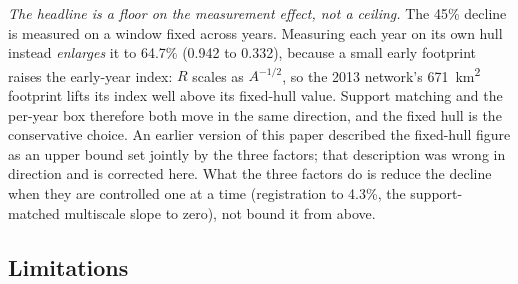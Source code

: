 \documentclass{article}
\newcommand{\rOwnHull}{64.7}
\newcommand{\rOwnHullFirst}{0.942}
\newcommand{\rOwnHullLast}{0.332}
\newcommand{\locHullDrop}{45}
\begin{document}
\noindent\emph{The headline is a floor on the measurement effect, not a ceiling.} The
\locHullDrop\% decline is measured on a window fixed across years. Measuring each year on its own
hull instead \emph{enlarges} it to \rOwnHull\% (\rOwnHullFirst{} to \rOwnHullLast), because a
small early footprint raises the early-year index: $R$ scales as $A^{-1/2}$, so the 2013 network's
\SI{671}{\kilo\meter\squared} footprint lifts its index well above its fixed-hull value. Support
matching and the per-year box therefore both move in the same direction, and the fixed hull is the
conservative choice. An earlier version of this paper described the fixed-hull figure as an upper
bound set jointly by the three factors; that description was wrong in direction and is corrected
here. What the three factors do is reduce the decline when they are controlled one at a time
(registration to \num{4.3}\%, the support-matched multiscale slope to zero), not bound it from
above.

\subsection{Limitations}
\label{sec:limits}
\end{document}
